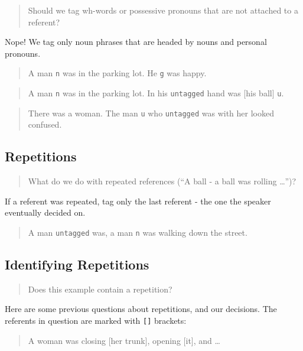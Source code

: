 \documentclass[
]{book}
\begin{document}
\begin{quote}
Should we tag wh-words or possessive pronouns that are not attached to a referent?
\end{quote}

Nope!
We tag only noun phrases that are headed by nouns and personal pronouns.

\begin{quote}
A man \texttt{n} was in the parking lot.
He \texttt{g} was happy.
\end{quote}

\begin{quote}
A man \texttt{n} was in the parking lot.
In his \texttt{untagged} hand was {[}his ball{]} \texttt{u}.
\end{quote}

\begin{quote}
There was a woman.
The man \texttt{u} who \texttt{untagged} was with her looked confused.
\end{quote}

\hypertarget{repetitions}{%
\subsection{Repetitions}\label{repetitions}}

\begin{quote}
What do we do with repeated references (``A ball - a ball was rolling \ldots{}'')?
\end{quote}

If a referent was repeated, tag only the last referent - the one the speaker eventually decided on.

\begin{quote}
A man \texttt{untagged} was, a man \texttt{n} was walking down the street.
\end{quote}

\hypertarget{identifying-repetitions}{%
\subsection{Identifying Repetitions}\label{identifying-repetitions}}

\begin{quote}
Does this example contain a repetition?
\end{quote}

Here are some previous questions about repetitions, and our decisions.
The referents in question are marked with \texttt{{[}{]}} brackets:

\begin{quote}
A woman was closing {[}her trunk{]}, opening {[}it{]}, and \ldots{}
\end{quote}
\end{document}
